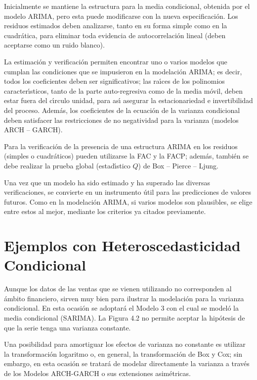 Inicialmente se mantiene la estructura para la media condicional, obtenida 
por el modelo ARIMA, pero esta puede modificarse con la nueva 
especificaci\'{o}n. Los residuos estimados deben analizarse, tanto en su 
forma simple como en la cuadr\'{a}tica, para eliminar toda evidencia de 
autocorrelaci\'{o}n lineal (deben aceptarse como un ruido blanco).

La estimaci\'{o}n y verificaci\'{o}n permiten encontrar uno o varios modelos 
que cumplan las condiciones que se impusieron en la modelaci\'{o}n ARIMA; es 
decir, todos los coeficientes deben ser significativos; las ra\'{\i}ces de 
los polinomios caracter\'{\i}sticos, tanto de la parte auto-regresiva como 
de la media m\'{o}vil, deben estar fuera del c\'{\i}rculo unidad, para 
as\'{\i} asegurar la estacionariedad e invertibilidad del proceso. 
Adem\'{a}s, los coeficientes de la ecuaci\'{o}n de la varianza condicional 
deben satisfacer las restricciones de no negatividad para la varianza 
(modelos ARCH -- GARCH). 

Para la verificaci\'{o}n de la presencia de una estructura ARIMA en los 
residuos (simples o cuadr\'{a}ticos) pueden utilizarse la FAC y la FACP; 
adem\'{a}s, tambi\'{e}n se debe realizar la prueba global (estad\'{\i}stico 
$Q$) de Box -- Pierce -- Ljung.

Una vez que un modelo ha sido estimado y ha superado las diversas 
verificaciones, se convierte en un instrumento \'{u}til para las 
predicciones de valores futuros. Como en la modelaci\'{o}n ARIMA, si varios 
modelos son plausibles, se elige entre estos al mejor, mediante los 
criterios ya citados previamente.




\section{Ejemplos con Heteroscedasticidad Condicional}

Aunque los datos de las ventas que se vienen utilizando no corresponden al 
\'{a}mbito financiero, sirven muy bien para ilustrar la modelaci\'{o}n para 
la varianza condicional. En esta ocasi\'{o}n se adoptar\'{a} el Modelo 3 con 
el cual se model\'{o} la media condicional (SARIMA). La Figura 4.2 no 
permite aceptar la hip\'{o}tesis de que la serie tenga una varianza 
constante.

Una posibilidad para amortiguar los efectos de varianza no constante es 
utilizar la transformaci\'{o}n logaritmo o, en general, la 
transformaci\'{o}n de Box y Cox; sin embargo, en esta ocasi\'{o}n se 
tratar\'{a} de modelar directamente la varianza a trav\'{e}s de los Modelos 
ARCH-GARCH o sus extensiones asim\'{e}tricas. 

